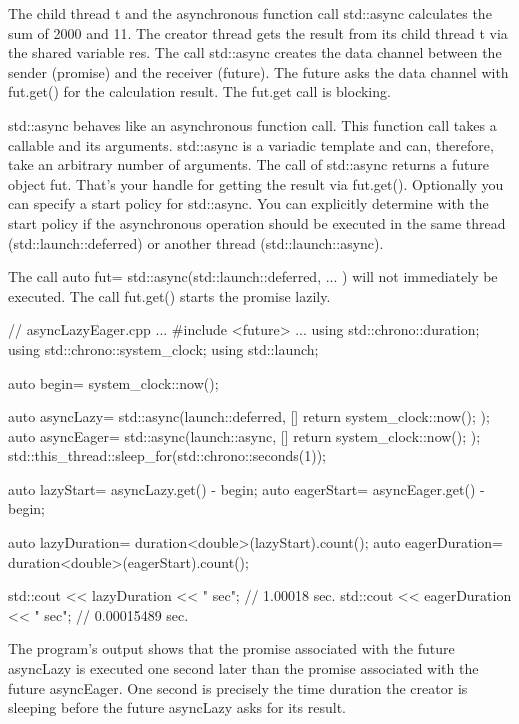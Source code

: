 The child thread t and the asynchronous function call std::async calculates the sum of 2000 and 11. The creator thread gets the result from its child thread t via the shared variable res. The call std::async creates the data channel between the sender (promise) and the receiver (future). The future asks the data channel with fut.get() for the calculation result. The fut.get call is blocking.


std::async behaves like an asynchronous function call. This function call takes a callable and its arguments. std::async is a variadic template and can, therefore, take an arbitrary number of arguments. The call of std::async returns a future object fut. That’s your handle for getting the result via fut.get(). Optionally you can specify a start policy for std::async. You can explicitly determine with the start policy if the asynchronous operation should be executed in the same thread (std::launch::deferred) or another thread (std::launch::async).

The call auto fut= std::async(std::launch::deferred, ... ) will not immediately be executed. The call fut.get() starts the promise lazily.


\begin{cpp}
// asyncLazyEager.cpp
...
#include <future>
...
using std::chrono::duration;
using std::chrono::system_clock;
using std::launch;

auto begin= system_clock::now();

auto asyncLazy= std::async(launch::deferred, []{ return system_clock::now(); });
auto asyncEager= std::async(launch::async, []{ return system_clock::now(); });
std::this_thread::sleep_for(std::chrono::seconds(1));

auto lazyStart= asyncLazy.get() - begin;
auto eagerStart= asyncEager.get() - begin;

auto lazyDuration= duration<double>(lazyStart).count();
auto eagerDuration= duration<double>(eagerStart).count();

std::cout << lazyDuration << " sec"; // 1.00018 sec.
std::cout << eagerDuration << " sec"; // 0.00015489 sec.
\end{cpp}

The program’s output shows that the promise associated with the future asyncLazy is executed one second later than the promise associated with the future asyncEager. One second is precisely the time duration the creator is sleeping before the future asyncLazy asks for its result.

